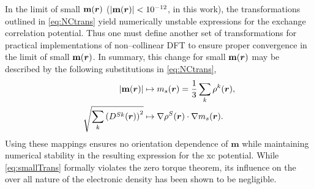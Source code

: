 In the limit of small $\mathbf{m}(\boldsymbol{r})$ ($\lvert \mathbf{m}(\boldsymbol{r}) \rvert < 10^{-12}$, in this work), the transformations outlined in 
\cref{eq:NCtrans} yield numerically unstable
expressions for the exchange correlation potential.\cite{Li17_2591} Thus one must define another set of transformations for practical
implementations of non--collinear DFT to ensure proper convergence in the limit of small $\mathbf{m}(\boldsymbol{r})$. In summary,
this change for small $\mathbf{m}(\boldsymbol{r})$ may be described by the following substitutions in \cref{eq:NCtrans},
\begin{subequations}
  \label{eq:smallTrans}
\begin{align}
  \vert \mathbf{m}(\boldsymbol{r}) \vert   &\mapsto m_s(\boldsymbol{r}) = \frac{1}{3}\sum_k \rho^k(\boldsymbol{r}),\\
  \sqrt{ \sum_k \left( D^{Sk} (\boldsymbol{r}) \right)^2} &\mapsto \nabla \rho^S(\boldsymbol{r}) \cdot \nabla m_s(\boldsymbol{r}).
\end{align}
\end{subequations}
Using these mappings ensures no orientation dependence of $\mathbf{m}$ while maintaining numerical stability
in the resulting expression for the xc potential. While \cref{eq:smallTrans} formally violates the zero
torque theorem, its influence on the over all nature of the electronic density has been shown to be 
negligible\cite{Li17_2591}.

